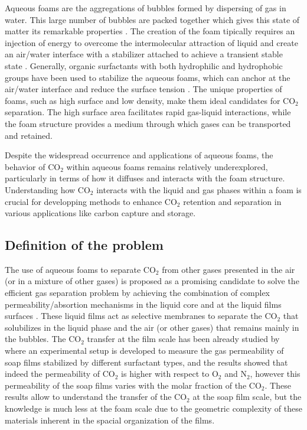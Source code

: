\documentclass{article}
\begin{document}
Aqueous foams are the aggregations of bubbles formed by dispersing of gas in water. This large number of bubbles are packed together which gives this state of matter its remarkable properties \cite[]{cantat2013foams}. The creation of the foam tipically requires an injection of energy to overcome the intermolecular attraction of liquid and create an air/water interface with a stabilizer attached to achieve a transient stable state \cite[]{langevin2017aqueous}. Generally, organic surfactants with both hydrophilic and hydrophobic groups have been used to stabilize the aqueous foams, which can anchor at the air/water interface and reduce the surface tension \cite[]{duan2023recent}. The unique properties of foams, such as high surface and low density, make them ideal candidates for CO$_2$ separation. The high surface area facilitates rapid gas-liquid interactions, while the foam structure provides a medium through which gases can be transported and retained. 

Despite the widespread occurrence and applications of aqueous foams, the behavior of CO$_2$ within aqueous foams remains relatively underexplored, particularly in terms of how it diffuses and interacts with the foam structure. Understanding how CO$_2$ interacts with the liquid and gas phases within a foam is crucial for developping methods to enhance CO$_2$ retention and separation in various applications like carbon capture and storage. 





\subsection{Definition of the problem}

The use of aqueous foams to separate CO$_2$ from other gases presented in the air (or in a mixture of other gases) is proposed as a promising candidate to solve the efficient gas separation problem by achieving the combination of complex permeability/absortion mechanisms in the liquid core and at the liquid films surfaces \cite[]{hadji2024soap}. These liquid films act as selective membranes to separate the CO$_2$ that solubilizes in the liquid phase and the air (or other gases) that remains mainly in the bubbles. The CO$_2$ transfer at the film scale has been already studied by \cite{hadji2024soap} where an experimental setup is developed to measure the gas permeability of soap films stabilized by different surfactant types, and the results showed that indeed the permeability of CO$_2$ is higher with respect to O$_2$ and N$_2$, however this permeability of the soap films varies with the molar fraction of the CO$_2$. These results allow to understand the transfer of the CO$_2$ at the soap film scale, but the knowledge is much less at the foam scale due to the geometric complexity of these materials inherent in the spacial organization of the films. 
\end{document}
